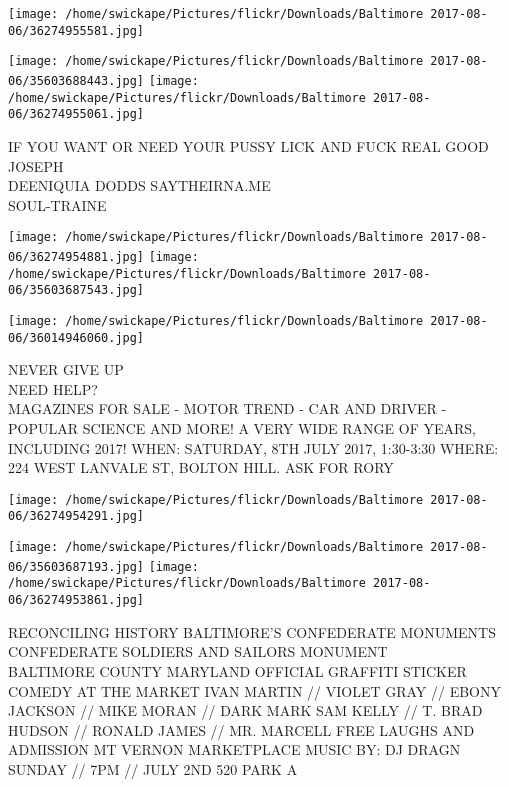 \documentclass[10pt,letterpaper]{article}
\begin{document}
\texttt{[image: /home/swickape/Pictures/flickr/Downloads/Baltimore 2017-08-06/36274955581.jpg]}

\vspace{0.25in}
\texttt{[image: /home/swickape/Pictures/flickr/Downloads/Baltimore 2017-08-06/35603688443.jpg]}
\texttt{[image: /home/swickape/Pictures/flickr/Downloads/Baltimore 2017-08-06/36274955061.jpg]}

IF YOU WANT OR NEED YOUR PUSSY LICK AND FUCK REAL GOOD JOSEPH\\
DEENIQUIA DODDS SAYTHEIRNA.ME\\
SOUL{-}TRAINE\\
\pagebreak

\texttt{[image: /home/swickape/Pictures/flickr/Downloads/Baltimore 2017-08-06/36274954881.jpg]}
\texttt{[image: /home/swickape/Pictures/flickr/Downloads/Baltimore 2017-08-06/35603687543.jpg]}

\texttt{[image: /home/swickape/Pictures/flickr/Downloads/Baltimore 2017-08-06/36014946060.jpg]}

NEVER GIVE UP\\
NEED HELP?\\
MAGAZINES FOR SALE {-} MOTOR TREND {-} CAR AND DRIVER {-} POPULAR SCIENCE AND MORE!  A VERY WIDE RANGE OF YEARS, INCLUDING 2017!  WHEN: SATURDAY, 8TH JULY 2017, 1:30{-}3:30 WHERE: 224 WEST LANVALE ST, BOLTON HILL.  ASK FOR RORY\\
\pagebreak

\texttt{[image: /home/swickape/Pictures/flickr/Downloads/Baltimore 2017-08-06/36274954291.jpg]}

\vspace{0.25in}
\texttt{[image: /home/swickape/Pictures/flickr/Downloads/Baltimore 2017-08-06/35603687193.jpg]}
\texttt{[image: /home/swickape/Pictures/flickr/Downloads/Baltimore 2017-08-06/36274953861.jpg]}

RECONCILING HISTORY BALTIMORE'S CONFEDERATE MONUMENTS CONFEDERATE SOLDIERS AND SAILORS MONUMENT\\
BALTIMORE COUNTY MARYLAND OFFICIAL GRAFFITI STICKER\\
COMEDY AT THE MARKET IVAN MARTIN // VIOLET GRAY  // EBONY JACKSON // MIKE MORAN // DARK MARK SAM KELLY // T. BRAD HUDSON // RONALD JAMES // MR. MARCELL FREE LAUGHS AND ADMISSION MT VERNON MARKETPLACE MUSIC BY: DJ DRAGN SUNDAY // 7PM // JULY 2ND 520 PARK A\\
\pagebreak
\end{document}
